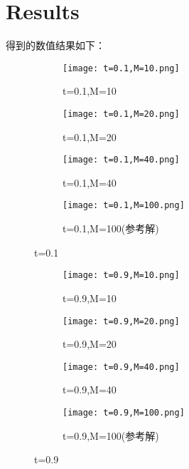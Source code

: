 \documentclass{article}
\begin{document}
\section{Results}

得到的数值结果如下：
\begin{figure}[H]
    \centering
    \begin{subfigure}[b]{0.47\textwidth}
        \centering
        \texttt{[image: t=0.1,M=10.png]}
        \caption{t=0.1,M=10}
    \end{subfigure}
    \begin{subfigure}[b]{0.47\textwidth}
        \centering
        \texttt{[image: t=0.1,M=20.png]}
        \caption{t=0.1,M=20}
    \end{subfigure}
    \begin{subfigure}[b]{0.47\textwidth}
        \centering
        \texttt{[image: t=0.1,M=40.png]}
        \caption{t=0.1,M=40}
    \end{subfigure}
    \begin{subfigure}[b]{0.47\textwidth}
        \centering
        \texttt{[image: t=0.1,M=100.png]}
        \caption{t=0.1,M=100(参考解)}
        
    \end{subfigure}
    \caption{t=0.1}
\end{figure}
\begin{figure}[H]
    \centering
    \begin{subfigure}[b]{0.47\textwidth}
        \centering
        \texttt{[image: t=0.9,M=10.png]}
        \caption{t=0.9,M=10}
    \end{subfigure}
    \begin{subfigure}[b]{0.47\textwidth}
        \centering
        \texttt{[image: t=0.9,M=20.png]}
        \caption{t=0.9,M=20}
    \end{subfigure}
    \begin{subfigure}[b]{0.47\textwidth}
        \centering
        \texttt{[image: t=0.9,M=40.png]}
        \caption{t=0.9,M=40}
    \end{subfigure}
    \begin{subfigure}[b]{0.47\textwidth}
        \centering
        \texttt{[image: t=0.9,M=100.png]}
        \caption{t=0.9,M=100(参考解)}
        
    \end{subfigure}
    \caption{t=0.9}
\end{figure}
\end{document}
